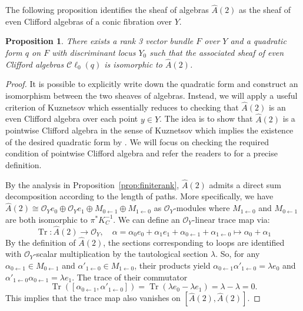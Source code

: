 \documentclass[11pt]{amsart}
\theoremstyle{plain}
\newtheorem{prop}[theorem]{Proposition}
\theoremstyle{definition}
\theoremstyle{remark}
\def\O{\mathcal{O}}
\def\a{\alpha}
\def\wA{\widehat{A}}
\begin{document}
    The following proposition identifies the sheaf of algebras $\wA(2)$ as the sheaf of even Clifford algebras of a conic fibration over $Y$. 

    \begin{prop}\label{prop:clifford}
        There exists a rank 3 vector bundle $F$ over $Y$ and a quadratic form $q$ on $F$ with discriminant locus $Y_0$ such that the associated sheaf of even Clifford algebras $\mathcal{C}\ell_0(q)$ is isomorphic to $\wA(2)$. 
    \end{prop}
    \begin{proof}
        It is possible to explicitly write down the quadratic form and construct an isomorphism between the two sheaves of algebras. Instead, we will apply a useful criterion of Kuznetsov which essentially reduces to checking that $\wA(2)$ is an even Clifford algebra over each point $y\in Y$. The idea is to show that $\wA(2)$ is a pointwise Clifford algebra in the sense of Kuznetsov  which implies the existence of the desired quadratic form by \cite[Proposition 2.7]{kuznetsov2025spinormodificationsconicbundles}. We will focus on checking the required condition of pointwise Clifford algebra and refer the readers to \cite[Definition 2.5]{kuznetsov2025spinormodificationsconicbundles} for a precise definition. 

        By the analysis in Proposition~\ref{prop:finiterank}, $\wA(2)$ admits a direct sum decomposition according to the length of paths. More specifically, we have $\wA(2) \cong \O_Ye_{0}\oplus \O_Y e_{1}\oplus M_{0\leftarrow 1} \oplus M_{1\leftarrow 0}$ as $\O_Y$-modules where $M_{1\leftarrow 0}$ and $M_{0\leftarrow 1}$ are both isomorphic to $\pi^*K_C^{-1}$. We can define an $\O_Y$-linear trace map via:
        \[ \operatorname{Tr}: \wA(2)\to \O_Y, \quad \a= \a_0 e_0+ \a_1e_1+ \a_{0\leftarrow 1} + \a_{1\leftarrow 0} \mapsto \a_0+\a_1 \]
        By the definition of $\wA(2)$, the sections corresponding to loops are identified with $\O_Y$-scalar multiplication by the tautological section $\lambda$. So, for any $\alpha_{0\leftarrow 1}\in M_{0\leftarrow 1}$ and $\alpha'_{1\leftarrow 0}\in M_{1\leftarrow 0}$, their products yield $\alpha_{0\leftarrow 1}\alpha'_{1\leftarrow 0} = \lambda e_0$ and  $\alpha'_{1\leftarrow 0}\alpha_{0\leftarrow 1} = \lambda e_1$. The trace of their commutator 
        \[\operatorname{Tr}([\alpha_{0\leftarrow 1},\alpha'_{1\leftarrow 0}]) = \operatorname{Tr}(\lambda e_0 - \lambda e_1) = \lambda - \lambda =0 .\]
        This implies that the trace map also vanishes on $[\wA(2), \wA(2)]$. 
        

\end{proof}
\end{document}
